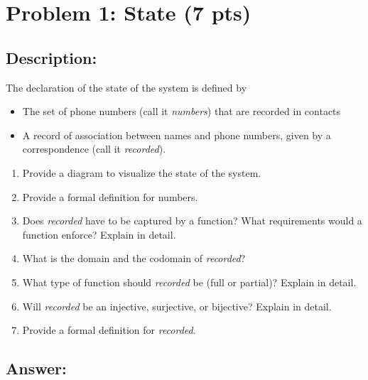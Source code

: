 \newpage
\section{Problem 1: State (7 pts)}

\subsection{Description:}

The declaration of the state of the system is defined by

\begin{itemize}
    \item The set of phone numbers (call it \textit{numbers}) that are recorded in contacts
    \item A record of association between names and phone numbers, given by a correspondence
        (call it \textit{recorded}).
\end{itemize}

\begin{enumerate}
    \item Provide a diagram to visualize the state of the system.
    \item Provide a formal definition for numbers.
    \item Does \textit{recorded} have to be captured by a function? What requirements would a function
enforce? Explain in detail.
    \item What is the domain and the codomain of \textit{recorded}?
    \item What type of function should \textit{recorded} be (full or partial)? Explain in detail.
    \item Will \textit{recorded} be an injective, surjective, or bijective? Explain in detail.
    \item Provide a formal definition for \textit{recorded}.
\end{enumerate}

\subsection{Answer:}

